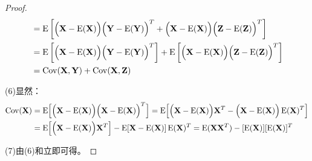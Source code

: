 \begin{proof}
\begin{gather*}
\begin{aligned}
			&=\operatorname{E}\left[\Bigl(\mathbf{X}-\operatorname{E}(\mathbf{X})\Bigr)\Bigl(\mathbf{Y}-\operatorname{E}(\mathbf{Y})\Bigr)^T+\Bigl(\mathbf{X}-\operatorname{E}(\mathbf{X})\Bigr)\Bigl(\mathbf{Z}-\operatorname{E}(\mathbf{Z})\Bigr)^T\right] \\
			&=\operatorname{E}\left[\Bigl(\mathbf{X}-\operatorname{E}(\mathbf{X})\Bigr)\Bigl(\mathbf{Y}-\operatorname{E}(\mathbf{Y})\Bigr)^T\right]+\operatorname{E}\left[\Bigl(\mathbf{X}-\operatorname{E}(\mathbf{X})\Bigr)\Bigl(\mathbf{Z}-\operatorname{E}(\mathbf{Z})\Bigr)^T\right] \\
			&=\operatorname{Cov}(\mathbf{X},\mathbf{Y})+\operatorname{Cov}(\mathbf{X},\mathbf{Z})
		\end{aligned}
	\end{gather*}\par
	(6)显然：
	\begin{align*}
		\operatorname{Cov}(\mathbf{X})
		&=\operatorname{E}\Bigl[\Bigl(\mathbf{X}-\operatorname{E}(\mathbf{X})\Bigr)\Bigl(\mathbf{X}-\operatorname{E}(\mathbf{X})\Bigr)^T\Bigr]
		=\operatorname{E}\Bigl[\Bigl(\mathbf{X}-\operatorname{E}(\mathbf{X})\Bigr)\mathbf{X}^T-\Bigl(\mathbf{X}-\operatorname{E}(\mathbf{X})\Bigr)\operatorname{E}(\mathbf{X})^T\Bigr] \\
		&=\operatorname{E}\Bigl[\Bigl(\mathbf{X}-\operatorname{E}(\mathbf{X})\Bigr)\mathbf{X}^T\Bigr]-\operatorname{E}[\mathbf{X}-\operatorname{E}(\mathbf{X})]\operatorname{E}(\mathbf{X})^T =\operatorname{E}(\mathbf{X}\mathbf{X}^T)-[\operatorname{E}(\mathbf{X})][\operatorname{E}(\mathbf{X})]^T
	\end{align*}\par
	(7)由(6)和立即可得。
\end{proof}

